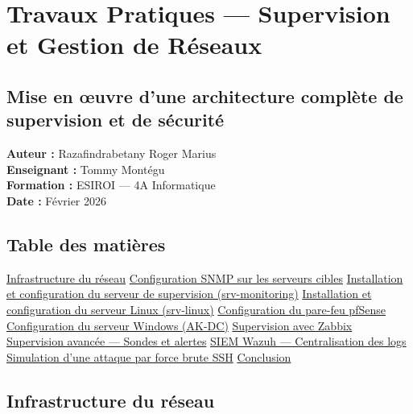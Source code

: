 \section{Travaux Pratiques --- Supervision et Gestion de
Réseaux}\label{travaux-pratiques-supervision-et-gestion-de-ruxe9seaux}

\subsection{Mise en œuvre d'une architecture complète de supervision et
de
sécurité}\label{mise-en-ux153uvre-dune-architecture-compluxe8te-de-supervision-et-de-suxe9curituxe9}

\textbf{Auteur :} Razafindrabetany Roger Marius\\
\textbf{Enseignant :} Tommy Montégu\\
\textbf{Formation :} ESIROI --- 4A Informatique\\
\textbf{Date :} Février 2026

\subsection{Table des matières}\label{table-des-matiuxe8res}

\hyperref[1-infrastructure-du-ruxe9seau]{Infrastructure du réseau}
\hyperref[2-configuration-snmp-sur-les-serveurs-cibles]{Configuration
SNMP sur les serveurs cibles}
\hyperref[3-installation-et-configuration-du-serveur-de-supervision]{Installation
et configuration du serveur de supervision (srv-monitoring)}
\hyperref[4-installation-et-configuration-du-serveur-linux]{Installation
et configuration du serveur Linux (srv-linux)}
\hyperref[5-configuration-du-pare-feu-pfsense]{Configuration du pare-feu
pfSense} \hyperref[6-configuration-du-serveur-windows]{Configuration du
serveur Windows (AK-DC)}
\hyperref[7-supervision-avec-zabbix]{Supervision avec Zabbix}
\hyperref[8-supervision-avancuxe9e--sondes-et-alertes]{Supervision
avancée --- Sondes et alertes}
\hyperref[9-siem-wazuh--centralisation-des-logs]{SIEM Wazuh ---
Centralisation des logs}
\hyperref[10-simulation-dune-attaque-par-force-brute-ssh]{Simulation
d'une attaque par force brute SSH} \hyperref[11-conclusion]{Conclusion}

\subsection{Infrastructure du réseau}\label{infrastructure-du-ruxe9seau}


